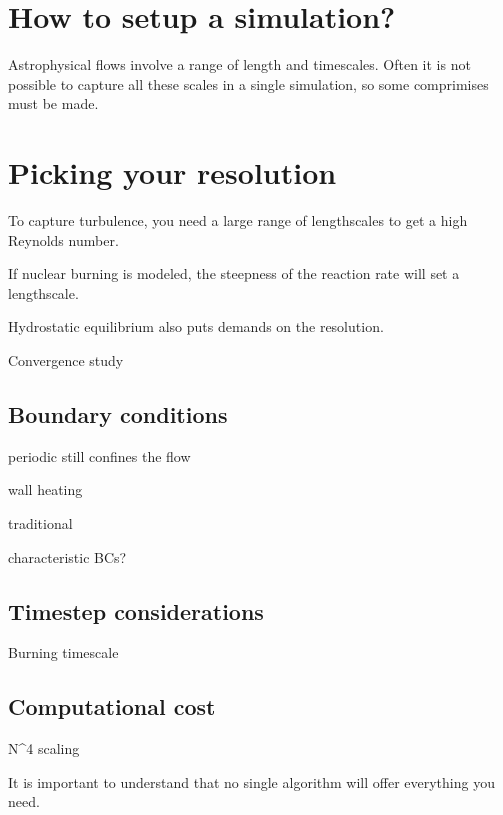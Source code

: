 \section{How to setup a simulation?}

Astrophysical flows involve a range of length and timescales.  Often
it is not possible to capture all these scales in a single simulation,
so some comprimises must be made.  

\section{Picking your resolution}

To capture turbulence, you need a large range of lengthscales to get a
high Reynolds number.  

If nuclear burning is modeled, the steepness of the reaction rate will
set a lengthscale.


Hydrostatic equilibrium also puts demands on the resolution.


Convergence study




\subsection{Boundary conditions}


periodic still confines the flow

wall heating


traditional


characteristic BCs?





\subsection{Timestep considerations}

Burning timescale



\subsection{Computational cost}

N^4 scaling




It is important to understand that no single algorithm will offer everything
you need.
